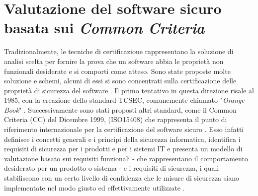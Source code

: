 \documentclass[../main.tex]{subfiles}
\begin{document}
\section{Valutazione del software sicuro basata sui \textit{Common Criteria}}
Tradizionalmente, le tecniche di certificazione rappresentano la soluzione di analisi scelta per fornire la prova che un software abbia le proprietà non funzionali desiderate e si comporti come atteso.
Sono state proposte molte soluzione e schemi, alcuni di essi si sono concentrati sulla certificazione delle proprietà di sicurezza del software \cite{CitCertSoa}.
Il primo tentativo in questa direzione risale al 1985, con la creazione dello standard TCSEC, comunemente chiamato "\textit{Orange Book}" \cite{OrangeBook}.
Successivamente sono stati proposti altri standard, come il Common Criteria (CC) del Dicembre 1999, (ISO15408) che rappresenta il punto di riferimento internazionale per la certificazione del software sicuro \cite{HerrmannCC}.
Esso infatti definisce i concetti generali e i principi della sicurezza informatica, identifica i requisiti di sicurezza per i prodotti e per i sistemi IT e presenta un modello di valutazione basato sui requisiti funzionali - che rappresentano il comportamento desiderato per un prodotto o sistema - e i requisiti di sicurezza, i quali stabiliscono con un certo livello di confidenza che le misure di sicurezza siano implementate nel modo giusto ed effettivamente utilizzate \cite{CommonCriteriaSans}.
\end{document}

